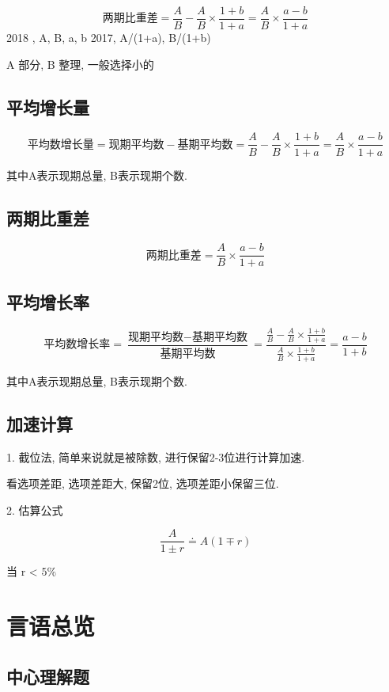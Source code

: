 \documentclass[UTF8]{ctexart}
\begin{document}
$$
	\mbox{两期比重差} = \frac{A}{B} - \frac{A}{B} \times \frac{1+b}{1+a} =
	\frac{A}{B} \times \frac{a-b}{1+a}
$$
2018  , A, B, a, b
2017, A/(1+a), B/(1+b)

A 部分, B 整理, 一般选择小的


\subsection{平均增长量}

$$
	\mbox{平均数增长量} = \mbox{现期平均数} - \mbox{基期平均数} = \frac{A}{B} - \frac{A}{B} \times \frac{1+b}{1+a} =
	\frac{A}{B} \times \frac{a-b}{1+a}
$$

其中A表示现期总量, B表示现期个数.

\subsection{两期比重差}
$$
	\mbox{两期比重差} = \frac{A}{B} \times \frac{a - b}{1+a}
$$

\subsection{平均增长率}

$$
	\mbox{平均数增长率} = \frac{\mbox{现期平均数} - \mbox{基期平均数}}{\mbox{基期平均数}} =
	\frac{\frac{A}{B}-\frac{A}{B} \times \frac{1+b}{1+a}}{\frac{A}{B} \times \frac{1+b}{1+a}} = \frac{a-b}{1+b}
$$

其中A表示现期总量, B表示现期个数.

\subsection{加速计算}
1. 截位法, 简单来说就是被除数, 进行保留2-3位进行计算加速.

看选项差距, 选项差距大, 保留2位, 选项差距小保留三位.

2. 估算公式

$$
	\frac{A}{1\pm r} \doteq A(1 \mp r)
$$

当 r < $5\%$




\section{言语总览}

\subsection{中心理解题}
\end{document}
